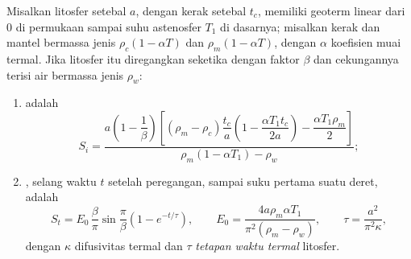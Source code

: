 \begin{proposition}\label{prop:b2:basins-compared:stretching}
Misalkan litosfer setebal $a$, dengan kerak setebal $t_c$, memiliki geoterm linear dari
$0$ di permukaan sampai suhu astenosfer $T_1$ di dasarnya; misalkan kerak dan mantel
bermassa jenis $\rho_c(1 - \alpha T)$ dan $\rho_m(1 - \alpha T)$, dengan $\alpha$ koefisien
muai termal. Jika litosfer itu diregangkan seketika dengan faktor $\beta$ dan cekungannya terisi
air bermassa jenis $\rho_w$:
\begin{enumerate}
  \item {} adalah
  \[
    S_i = \frac{a\left(1 - \dfrac{1}{\beta}\right)\left[(\rho_m - \rho_c)\dfrac{t_c}{a}
          \left(1 - \dfrac{\alpha T_1 t_c}{2a}\right) - \dfrac{\alpha T_1 \rho_m}{2}\right]}
          {\rho_m(1 - \alpha T_1) - \rho_w};
  \]
  \item {}, selang waktu $t$ setelah peregangan, sampai suku pertama suatu deret, adalah
  \[
    S_t = E_0\,\frac{\beta}{\pi}\sin\frac{\pi}{\beta}\left(1 - e^{-t/\tau}\right),\qquad
    E_0 = \frac{4a\rho_m\alpha T_1}{\pi^2(\rho_m - \rho_w)},\qquad
    \tau = \frac{a^2}{\pi^2\kappa},
  \]
  dengan $\kappa$ difusivitas termal dan $\tau$ \emph{tetapan waktu
  termal} litosfer.
\end{enumerate}
\end{proposition}

